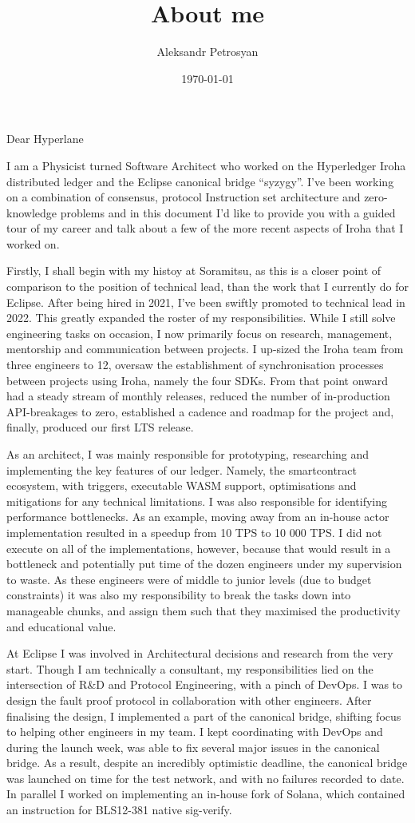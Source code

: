 \documentclass[11pt]{scrlttr2}
\author{Aleksandr Petrosyan}
\date{\today}
\title{About me}
\begin{document}
\begin{letter}{
}

\opening{Dear Hyperlane}

I am a Physicist turned Software Architect who worked on the
Hyperledger Iroha distributed ledger and the Eclipse canonical bridge
``syzygy''.  I've been working on a combination of consensus, protocol
Instruction set architecture and zero-knowledge problems and in this
document I'd like to provide you with a guided tour of my career and
talk about a few of the more recent aspects of Iroha that I worked on.

Firstly, I shall begin with my histoy at Soramitsu, as this is a
closer point of comparison to the position of technical lead, than the
work that I currently do for Eclipse.  After being hired in 2021, I've
been swiftly promoted to technical lead in 2022. This greatly expanded
the roster of my responsibilities. While I still solve engineering
tasks on occasion, I now primarily focus on research, management,
mentorship and communication between projects. I up-sized the Iroha
team from three engineers to 12, oversaw the establishment of
synchronisation processes between projects using Iroha, namely the
four SDKs. From that point onward had a steady stream of monthly
releases, reduced the number of in-production API-breakages to zero,
established a cadence and roadmap for the project and, finally,
produced our first LTS release.

As an architect, I was mainly responsible for prototyping, researching
and implementing the key features of our ledger. Namely, the
smartcontract ecosystem, with triggers, executable WASM support,
optimisations and mitigations for any technical limitations.  I was
also responsible for identifying performance bottlenecks. As an
example, moving away from an in-house actor implementation resulted in
a speedup from 10 TPS to 10 000 TPS. I did not execute on all of the
implementations, however, because that would result in a bottleneck
and potentially put time of the dozen engineers under my supervision
to waste.  As these engineers were of middle to junior levels (due to
budget constraints) it was also my responsibility to break the tasks
down into manageable chunks, and assign them such that they maximised
the productivity and educational value.

At Eclipse I was involved in Architectural decisions and research from
the very start.  Though I am technically a consultant, my
responsibilities lied on the intersection of R&D and Protocol
Engineering, with a pinch of DevOps.  I was to design the fault proof
protocol in collaboration with other engineers.  After finalising the
design, I implemented a part of the canonical bridge, shifting focus
to helping other engineers in my team.  I kept coordinating with
DevOps and during the launch week, was able to fix several major
issues in the canonical bridge.  As a result, despite an incredibly
optimistic deadline, the canonical bridge was launched on time for the
test network, and with no failures recorded to date.  In parallel I
worked on implementing an in-house fork of Solana, which contained an
instruction for BLS12-381 native sig-verify.


\end{letter}
\end{document}

